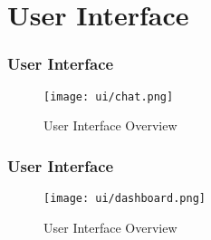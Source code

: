 \section{User Interface}

\begin{frame}
  \frametitle{User Interface}
  \begin{figure}
    \centering
    \texttt{[image: ui/chat.png]} %
    \caption{User Interface Overview}
  \end{figure}
\end{frame}

\begin{frame}
  \frametitle{User Interface}
  \begin{figure}
    \centering
    \texttt{[image: ui/dashboard.png]} %
    \caption{User Interface Overview}
  \end{figure}
  \end{frame}